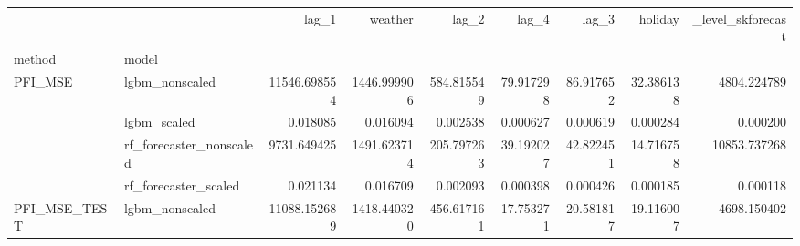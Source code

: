 \begin{tabular}{llrrrrrrr}
\toprule
 &  & lag\_1 & weather & lag\_2 & lag\_4 & lag\_3 & holiday & \_level\_skforecast \\
method & model &  &  &  &  &  &  &  \\
\midrule
\multirow[c]{4}{*}{PFI\_MSE} & lgbm\_nonscaled & {\cellcolor[HTML]{B40426}} \color[HTML]{F1F1F1} 11546.698554 & {\cellcolor[HTML]{6180E9}} \color[HTML]{F1F1F1} 1446.999906 & {\cellcolor[HTML]{4961D2}} \color[HTML]{F1F1F1} 584.815549 & {\cellcolor[HTML]{3C4EC2}} \color[HTML]{F1F1F1} 79.917298 & {\cellcolor[HTML]{3C4EC2}} \color[HTML]{F1F1F1} 86.917652 & {\cellcolor[HTML]{3B4CC0}} \color[HTML]{F1F1F1} 32.386138 & {\cellcolor[HTML]{C5D6F2}} \color[HTML]{000000} 4804.224789 \\
 & lgbm\_scaled & {\cellcolor[HTML]{B40426}} \color[HTML]{F1F1F1} 0.018085 & {\cellcolor[HTML]{D95847}} \color[HTML]{F1F1F1} 0.016094 & {\cellcolor[HTML]{6384EB}} \color[HTML]{F1F1F1} 0.002538 & {\cellcolor[HTML]{4257C9}} \color[HTML]{F1F1F1} 0.000627 & {\cellcolor[HTML]{4257C9}} \color[HTML]{F1F1F1} 0.000619 & {\cellcolor[HTML]{3C4EC2}} \color[HTML]{F1F1F1} 0.000284 & {\cellcolor[HTML]{3B4CC0}} \color[HTML]{F1F1F1} 0.000200 \\
 & rf\_forecaster\_nonscaled & {\cellcolor[HTML]{D75445}} \color[HTML]{F1F1F1} 9731.649425 & {\cellcolor[HTML]{6485EC}} \color[HTML]{F1F1F1} 1491.623714 & {\cellcolor[HTML]{3F53C6}} \color[HTML]{F1F1F1} 205.797263 & {\cellcolor[HTML]{3B4CC0}} \color[HTML]{F1F1F1} 39.192027 & {\cellcolor[HTML]{3B4CC0}} \color[HTML]{F1F1F1} 42.822451 & {\cellcolor[HTML]{3B4CC0}} \color[HTML]{F1F1F1} 14.716758 & {\cellcolor[HTML]{B40426}} \color[HTML]{F1F1F1} 10853.737268 \\
 & rf\_forecaster\_scaled & {\cellcolor[HTML]{B40426}} \color[HTML]{F1F1F1} 0.021134 & {\cellcolor[HTML]{EF886B}} \color[HTML]{F1F1F1} 0.016709 & {\cellcolor[HTML]{5875E1}} \color[HTML]{F1F1F1} 0.002093 & {\cellcolor[HTML]{3E51C5}} \color[HTML]{F1F1F1} 0.000398 & {\cellcolor[HTML]{3E51C5}} \color[HTML]{F1F1F1} 0.000426 & {\cellcolor[HTML]{3B4CC0}} \color[HTML]{F1F1F1} 0.000185 & {\cellcolor[HTML]{3B4CC0}} \color[HTML]{F1F1F1} 0.000118 \\
\multirow[c]{4}{*}{PFI\_MSE\_TEST} & lgbm\_nonscaled & {\cellcolor[HTML]{B40426}} \color[HTML]{F1F1F1} 11088.152689 & {\cellcolor[HTML]{6282EA}} \color[HTML]{F1F1F1} 1418.440320 & {\cellcolor[HTML]{465ECF}} \color[HTML]{F1F1F1} 456.617161 & {\cellcolor[HTML]{3B4CC0}} \color[HTML]{F1F1F1} 17.753271 & {\cellcolor[HTML]{3B4CC0}} \color[HTML]{F1F1F1} 20.581817 & {\cellcolor[HTML]{3B4CC0}} \color[HTML]{F1F1F1} 19.116007 & {\cellcolor[HTML]{C7D7F0}} \color[HTML]{000000} 4698.150402 \\

\end{tabular}
